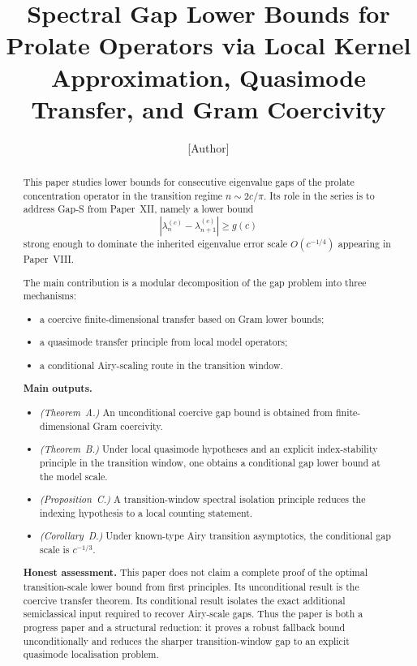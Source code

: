 \documentclass[12pt,a4paper]{amsart}
\theoremstyle{definition}
\theoremstyle{remark}
\newcommand{\lambdac}[2]{\lambda_{#2}^{(#1)}}
\begin{document}
\title[Spectral Gap Lower Bounds for Prolate Operators]{%
  Spectral Gap Lower Bounds for Prolate Operators via Local Kernel Approximation,
  Quasimode Transfer, and Gram Coercivity}

\author{[Author]}
\address{[Address]}
\email{[Email]}

\begin{abstract}
This paper studies lower bounds for consecutive eigenvalue gaps of the
prolate concentration operator in the transition regime
$n \sim 2c/\pi$.
Its role in the series is to address Gap-S from Paper~XII,
namely a lower bound
\[
  |\lambdac{c}{n}-\lambdac{c}{n+1}| \ge g(c)
\]
strong enough to dominate the inherited eigenvalue error scale
$O(c^{-1/4})$ appearing in Paper~VIII.

\medskip
The main contribution is a modular decomposition of the gap problem into
three mechanisms:
\begin{itemize}
\item a coercive finite-dimensional transfer based on Gram lower bounds;
\item a quasimode transfer principle from local model operators;
\item a conditional Airy-scaling route in the transition window.
\end{itemize}

\medskip
\textbf{Main outputs.}
\begin{itemize}
\item \emph{(Theorem~A.)} An unconditional coercive gap bound is obtained
  from finite-dimensional Gram coercivity.
\item \emph{(Theorem~B.)} Under local quasimode hypotheses and an explicit
  index-stability principle in the transition window, one obtains a
  conditional gap lower bound at the model scale.
\item \emph{(Proposition~C.)} A transition-window spectral isolation
  principle reduces the indexing hypothesis to a local counting statement.
\item \emph{(Corollary~D.)} Under known-type Airy transition asymptotics,
  the conditional gap scale is $c^{-1/3}$.
\end{itemize}

\medskip
\textbf{Honest assessment.}
This paper does not claim a complete proof of the optimal transition-scale
lower bound from first principles.
Its unconditional result is the coercive transfer theorem.
Its conditional result isolates the exact additional semiclassical input
required to recover Airy-scale gaps.
Thus the paper is both a progress paper and a structural reduction:
it proves a robust fallback bound unconditionally and reduces the sharper
transition-window gap to an explicit quasimode localisation problem.
\end{abstract}
\end{document}
